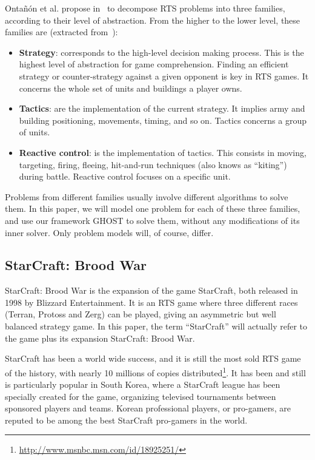 \documentclass[journal]{IEEEtran}
\newcommand{\ghost}{\textsc{GHOST}\xspace}
\begin{document}
Onta{\~n}{\'o}n et  al. propose in~\cite{OntanonSURCM13}  to decompose
RTS  problems  into  three  families,  according  to  their  level  of
abstraction. From  the higher to  the lower level, these  families are
(extracted from~\cite{OntanonSURCM13}):
\begin{itemize}
\item {\bf  Strategy}: corresponds  to the high-level  decision making
  process.   This is  the highest  level of  abstraction for game
  comprehension.   Finding an  efficient strategy  or counter-strategy
  against a given opponent is key  in RTS games. It concerns the whole
  set of units and buildings a player owns.
\item {\bf Tactics}:  are the implementation of  the current strategy.
  It implies army and building  positioning, movements, timing, and so
  on. Tactics concerns a group of units.
\item {\bf Reactive  control}: is the implementation  of tactics. This
  consists   in  moving,   targeting,  firing,   fleeing,  hit-and-run
  techniques  (also  knows  as ``kiting'')  during  battle.   Reactive
  control focuses on a specific unit.
\end{itemize}
Problems from different families  usually involve different algorithms
to solve them.  In  this paper, we will model one  problem for each of
these three families,  and use our framework \ghost to  solve them, without
any modifications  of its inner  solver. Only  problem models  will, of
course, differ.

\subsection{StarCraft: Brood War}

StarCraft:  Brood War  is the  expansion of  the game  StarCraft, both
released in 1998  by Blizzard Entertainment.  It is an  RTS game where
three  different  races (Terran, Protoss and Zerg)  can be played,
giving an  asymmetric but well balanced strategy  game.  In
this paper,  the term  ``StarCraft'' will actually  refer to  the game
plus its expansion StarCraft: Brood War.

StarCraft has  been a world wide  success, and it is still  the most sold
RTS game of the history, with nearly 10 millions of copies distributed\footnote{\url{http://www.msnbc.msn.com/id/18925251/}}. It has
been  and  still is  particularly  popular  in  South Korea,  where  a
StarCraft league has  been specially created for  the game, organizing
televised  tournaments between  sponsored players  and teams.   Korean
professional players, or pro-gamers, are  reputed to be among the best
StarCraft pro-gamers in the world.
\end{document}

